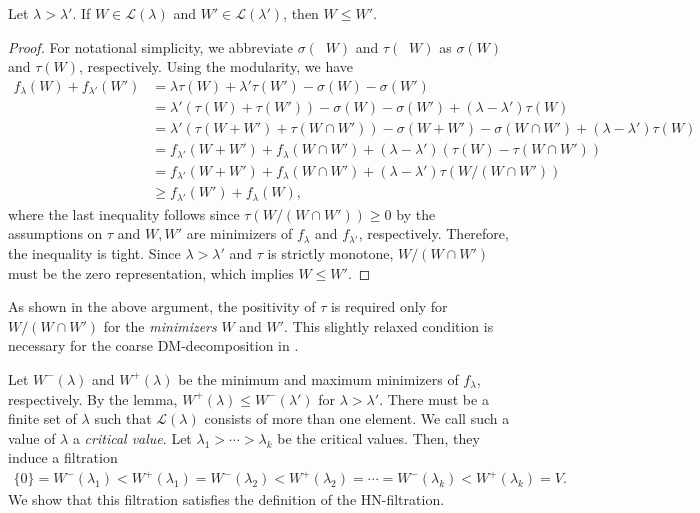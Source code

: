 \documentclass[a4paper,11pt]{article}
\numberwithin{equation}{section}
\newcommand{\caL}{\mathcal{L}}
\DeclareMathOperator{\dimv}{\underline{dim}}
\begin{document}
\begin{lemma}
    Let $\lambda > \lambda'$. If $W \in \caL(\lambda)$ and $W' \in \caL(\lambda')$, then $W \leq W'$.
\end{lemma}
\begin{proof}
    For notational simplicity, we abbreviate $\sigma(\dimv W)$ and $\tau(\dimv W)$ as $\sigma(W)$ and $\tau(W)$, respectively.
    Using the modularity, we have
    \begin{align}
        f_\lambda(W) + f_{\lambda'}(W') 
        &= \lambda \tau(W) + \lambda' \tau(W') - \sigma(W) - \sigma(W') \\
        &= \lambda' (\tau(W) + \tau(W')) - \sigma(W) - \sigma(W') + (\lambda - \lambda') \tau(W) \\
        &= \lambda' (\tau(W + W') + \tau(W \cap W')) - \sigma(W + W') - \sigma(W \cap W') + (\lambda - \lambda') \tau(W) \\
        &= f_{\lambda'}(W + W')  + f_{\lambda}(W \cap W') + (\lambda - \lambda') (\tau(W) - \tau(W \cap W')) \\
        &= f_{\lambda'}(W + W')  + f_{\lambda}(W \cap W') + (\lambda - \lambda') \tau(W/(W \cap W')) \\
        &\geq f_{\lambda'}(W')  + f_{\lambda}(W), 
    \end{align}
    where the last inequality follows since $\tau(W / (W \cap W')) \geq 0$ by the assumptions on $\tau$ and $W, W'$ are minimizers of $f_\lambda$ and $f_{\lambda'}$, respectively.
    Therefore, the inequality is tight.
    Since $\lambda > \lambda'$ and $\tau$ is strictly monotone, $W / (W \cap W')$ must be the zero representation, which implies $W \leq W'$.
\end{proof}

\begin{remark}\label{rem:strict-monotone}
    As shown in the above argument, the positivity of $\tau$ is required only for $W / (W \cap W')$ for the \emph{minimizers} $W$ and $W'$.
    This slightly relaxed condition is necessary for the coarse DM-decomposition in .
\end{remark}

Let $W^-(\lambda)$ and $W^+(\lambda)$ be the minimum and maximum minimizers of $f_\lambda$, respectively.
By the lemma, $W^+(\lambda) \leq W^-(\lambda')$ for $\lambda > \lambda'$.
There must be a finite set of $\lambda$ such that $\caL(\lambda)$ consists of more than one element.
We call such a value of $\lambda$ a \emph{critical value}.
Let $\lambda_1 > \cdots > \lambda_k$ be the critical values.
Then, they induce a filtration
\begin{align}
    \{0\} = W^-(\lambda_1) < W^+(\lambda_1) = W^-(\lambda_2) < W^+(\lambda_2) =  \cdots = W^-(\lambda_k) < W^+(\lambda_k) = V.
\end{align}
We show that this filtration satisfies the definition of the HN-filtration.
\end{document}
